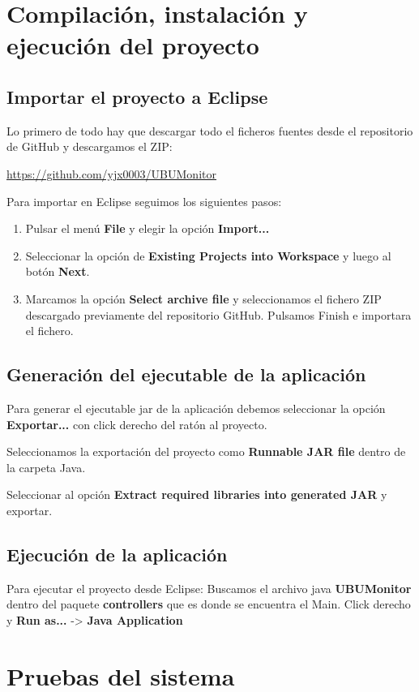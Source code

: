\section{Compilación, instalación y ejecución del proyecto}

\subsection{Importar el proyecto a Eclipse}
Lo primero de todo hay que descargar todo el ficheros fuentes desde el repositorio de GitHub y descargamos el ZIP:

\href{https://github.com/yjx0003/UBUMonitor}{https://github.com/yjx0003/UBUMonitor}

Para importar en Eclipse seguimos los siguientes pasos:

\begin{enumerate}
	\item Pulsar el menú \textbf{File} y elegir la opción \textbf{Import...}
	\item Seleccionar la opción de \textbf{Existing Projects into
		Workspace} y luego al botón \textbf{Next}.
	\item Marcamos la opción \textbf{Select archive file} y seleccionamos el fichero ZIP descargado previamente del repositorio GitHub. Pulsamos Finish e importara el fichero.
	
\end{enumerate}

\subsection{Generación del ejecutable de la aplicación}

Para generar el ejecutable jar de la aplicación debemos seleccionar la opción \textbf{Exportar...} con click derecho del ratón al proyecto.

Seleccionamos la exportación del proyecto como \textbf{Runnable JAR file} dentro de la carpeta Java.


Seleccionar al opción \textbf{ Extract required libraries into generated JAR} y exportar.


\subsection{Ejecución de la aplicación}

Para ejecutar el proyecto desde Eclipse: Buscamos el archivo java \textbf{UBUMonitor} dentro del paquete \textbf{controllers} que es donde se encuentra el Main. Click derecho y \textbf{Run as...} -> \textbf{Java Application}

\section{Pruebas del sistema}
